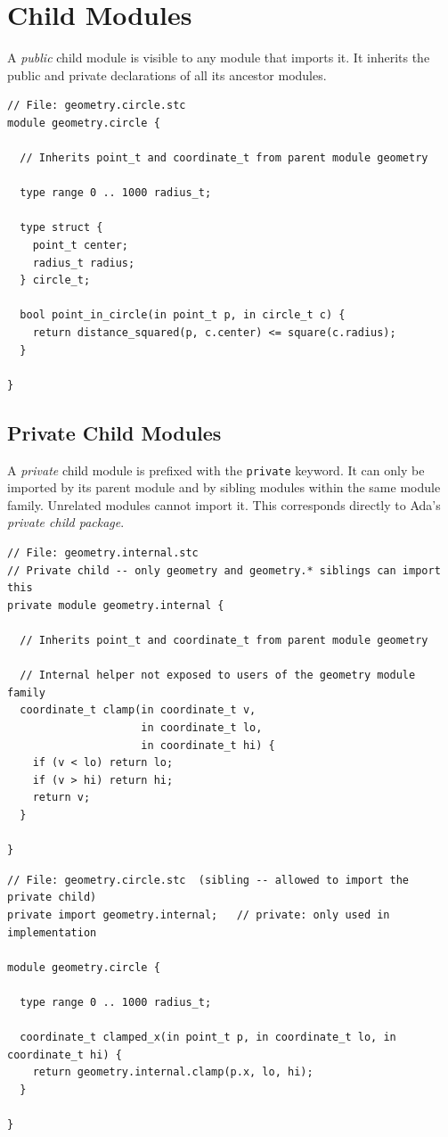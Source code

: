 \documentclass[11pt,letterpaper,twoside,openany]{book}
\begin{document}
\section{Child Modules}

A \emph{public} child module is visible to any module that imports it.
It inherits the public and private declarations of all its ancestor modules.

\begin{lstlisting}
// File: geometry.circle.stc
module geometry.circle {

  // Inherits point_t and coordinate_t from parent module geometry

  type range 0 .. 1000 radius_t;

  type struct {
    point_t center;
    radius_t radius;
  } circle_t;

  bool point_in_circle(in point_t p, in circle_t c) {
    return distance_squared(p, c.center) <= square(c.radius);
  }

}
\end{lstlisting}

\subsection{Private Child Modules}

A \emph{private} child module is prefixed with the \verb'private' keyword.
It can only be imported by its parent module and by sibling modules within
the same module family.  Unrelated modules cannot import it.
This corresponds directly to Ada's \emph{private child package}.

\begin{lstlisting}
// File: geometry.internal.stc
// Private child -- only geometry and geometry.* siblings can import this
private module geometry.internal {

  // Inherits point_t and coordinate_t from parent module geometry

  // Internal helper not exposed to users of the geometry module family
  coordinate_t clamp(in coordinate_t v,
                     in coordinate_t lo,
                     in coordinate_t hi) {
    if (v < lo) return lo;
    if (v > hi) return hi;
    return v;
  }

}
\end{lstlisting}

\begin{lstlisting}
// File: geometry.circle.stc  (sibling -- allowed to import the private child)
private import geometry.internal;   // private: only used in implementation

module geometry.circle {

  type range 0 .. 1000 radius_t;

  coordinate_t clamped_x(in point_t p, in coordinate_t lo, in coordinate_t hi) {
    return geometry.internal.clamp(p.x, lo, hi);
  }

}
\end{lstlisting}
\end{document}
